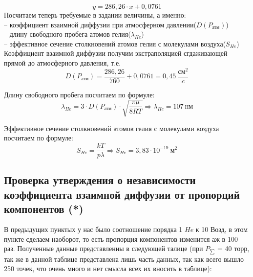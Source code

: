 \documentclass[a4paper,12pt]{article}
\begin{document}
\begin{equation}
	y = 286,26\cdot x + 0,0761
\end{equation}
Посчитаем теперь требуемые в задании величины, а именно:\\
	-- коэффициент взаимной диффузии при атмосферном давлении($D(P_{\text{атм}})$) \\
	-- длину свободного пробега атомов гелия($\lambda_{He}$)\\
	-- эффективное сечение столкновений атомов гелия с молекулами воздуха($S_{He}$)\\
	
Коэффициент взаимной диффузии получим экстраполяцией сгдаживающей прямой до атмосферного давления, т.е.
\begin{equation}
	D(P_{\text{атм}}) = \frac{286,26}{760} + 0,0761 = 0,45\ \frac{\text{см}^2}{c}
\end{equation}

Длину свободного пробега посчитаем по формуле:
\begin{equation}
	\lambda_{He} = 3\cdot D(P_{\text{атм}})\cdot \sqrt{\dfrac{\pi \mu}{8RT}} \Rightarrow  \lambda_{He} = 107\ \text{нм}
\end{equation}

Эффективное сечение столкновений атомов гелия с молекулами воздуха посчитаем по формуле:
\begin{equation}
	S_{He} = \frac{kT}{p\lambda} \Rightarrow S_{He} = 3,83 \cdot 10^{-19}\ \text{м}^2
\end{equation}


\subsection{Проверка утверждения о независимости коэффициента взаимной диффузии от пропорций компонентов (*)}

В предыдущих пунктых у нас было соотношение порядка 1 $He$ к 10 Возд, в этом пункте сделаем наоборот, то есть пропорция компонентов изменится аж в 100 раз. Полученные данные представленны в следующей талице (при $P_{\sum}$ = 40 торр, так же в данной таблице представлена лишь часть данных, так как всего вышло 250 точек, что очень много и нет смысла всех их вносить в таблице):
\end{document}

